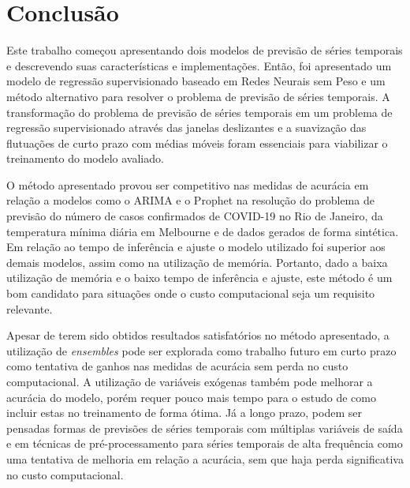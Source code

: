 \chapter{Conclusão}
\label{chap:06}

Este trabalho começou apresentando dois modelos de previsão de séries temporais e descrevendo suas características e implementações. Então, foi apresentado um modelo de regressão supervisionado baseado em Redes Neurais sem Peso e um método alternativo para resolver o problema de previsão de séries temporais. A transformação do problema de previsão de séries temporais em um problema de regressão supervisionado através das janelas deslizantes e a suavização das flutuações de curto prazo com médias móveis foram essenciais para viabilizar o treinamento do modelo avaliado.

O método apresentado provou ser competitivo nas medidas de acurácia em relação a modelos como o ARIMA e o Prophet na resolução do problema de previsão do número de casos confirmados de COVID-19 no Rio de Janeiro, da temperatura mínima diária em Melbourne e de dados gerados de forma sintética. Em relação ao tempo de inferência e ajuste o modelo utilizado foi superior aos demais modelos, assim como na utilização de memória. Portanto, dado a baixa utilização de memória e o baixo tempo de inferência e ajuste, este método é um bom candidato para situações onde o custo computacional seja um requisito relevante.

Apesar de terem sido obtidos resultados satisfatórios no método apresentado, a utilização de \textit{ensembles} pode ser explorada como trabalho futuro em curto prazo como tentativa de ganhos nas medidas de acurácia sem perda no custo computacional. A utilização de variáveis exógenas também pode melhorar a acurácia do modelo, porém requer pouco mais tempo para o estudo de como incluir estas no treinamento de forma ótima. Já a longo prazo, podem ser pensadas formas de previsões de séries temporais com múltiplas variáveis de saída e em técnicas de pré-processamento para séries temporais de alta frequência como uma tentativa de melhoria em relação a acurácia, sem que haja perda significativa no custo computacional.
